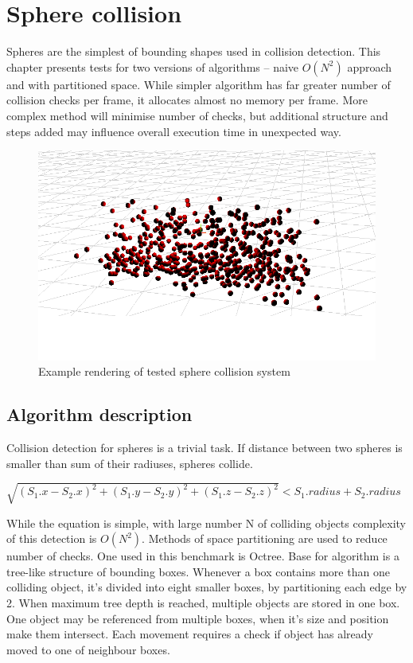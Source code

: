 \chapter{Sphere collision}
\label{cha:spherecollision}

Spheres are the simplest of bounding shapes used in collision detection. This chapter presents tests for two versions of algorithms -- naive $O(N^2)$ approach and with partitioned space. While simpler algorithm has far greater number of collision checks per frame, it allocates almost no memory per frame. More complex method will minimise number of checks, but additional structure and steps added may influence overall execution time in unexpected way.


\begin{figure}[h!]
  \caption{Example rendering of tested sphere collision system}
  \label{img:spheres}
  \centering
	\includegraphics[width=16cm]{spheres/render.png}
\end{figure}

\section{Algorithm description}
\label{sec:spherealgorithmdescription}

Collision detection for spheres is a trivial task. If distance between two spheres is smaller than sum of their radiuses, spheres collide.

$\sqrt{(S_1.x - S_2.x)^2 + (S_1.y - S_2.y)^2 + (S_1.z - S_2.z)^2} < S_1.radius + S_2.radius$

While the equation is simple, with large number N of colliding objects complexity of this detection is $O(N^2)$. Methods of space partitioning are used to reduce number of checks. One used in this benchmark is Octree.
Base for algorithm is a tree-like structure of bounding boxes. Whenever a box contains more than one colliding object, it's divided into eight smaller boxes, by partitioning each edge by 2. When maximum tree depth is reached, multiple objects are stored in one box. One object may be referenced from multiple boxes, when it's size and position make them intersect. Each movement requires a check if object has already moved to one of neighbour boxes.

